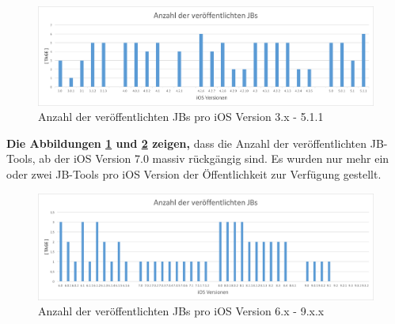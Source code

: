 \begin{figure}[hp!]
        \centering
                \includegraphics[scale=0.5]{Bilder/iOSJB1.png}
        \caption{Anzahl der veröffentlichten JBs pro iOS Version 3.x - 5.1.1}
        \label{fig:AnalyseAnzahliOSJB1}
\end{figure}

\textbf{Die Abbildungen \ref{fig:AnalyseAnzahliOSJB1} und \ref{fig:AnalyseAnzahliOSJB2} zeigen,} dass die Anzahl der veröffentlichten JB-Tools, ab der iOS Version 7.0 massiv rückgängig sind. Es wurden nur mehr ein oder zwei JB-Tools pro iOS Version der Öffentlichkeit zur Verfügung gestellt. 

\begin{figure}[hp!]
        \centering
                \includegraphics[scale=0.5]{Bilder/iOSJB2.png}
        \caption{Anzahl der veröffentlichten JBs pro iOS Version 6.x - 9.x.x}
        \label{fig:AnalyseAnzahliOSJB2}
\end{figure}


